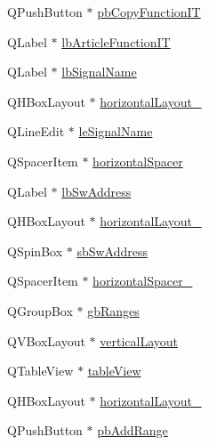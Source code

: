 \begin{DoxyCompactItemize}
\item 
Q\-Push\-Button $\ast$ \hyperlink{class_ui__mdt_cl_unit_connection_dialog_a7ccdc4772dbca1919fd77f73e4c1413b}{pb\-Copy\-Function\-I\-T}
\item 
Q\-Label $\ast$ \hyperlink{class_ui__mdt_cl_unit_connection_dialog_a7cb9be6da084f70be9ac5739bd8be3ca}{lb\-Article\-Function\-I\-T}
\item 
Q\-Label $\ast$ \hyperlink{class_ui__mdt_cl_unit_connection_dialog_a3bd4f5a49ae25bb621e2d2cba70c311f}{lb\-Signal\-Name}
\item 
Q\-H\-Box\-Layout $\ast$ \hyperlink{class_ui__mdt_cl_unit_connection_dialog_a78e9f20d85dd708397b44151debdbf25}{horizontal\-Layout\-\_}
\item 
Q\-Line\-Edit $\ast$ \hyperlink{class_ui__mdt_cl_unit_connection_dialog_aae843ac09a6334f90d2956aad37697ed}{le\-Signal\-Name}
\item 
Q\-Spacer\-Item $\ast$ \hyperlink{class_ui__mdt_cl_unit_connection_dialog_aea88a25a7d7660378eb7060bc297d7cd}{horizontal\-Spacer}
\item 
Q\-Label $\ast$ \hyperlink{class_ui__mdt_cl_unit_connection_dialog_ae214f352127ef47f8d492a431c25ff27}{lb\-Sw\-Address}
\item 
Q\-H\-Box\-Layout $\ast$ \hyperlink{class_ui__mdt_cl_unit_connection_dialog_a449b34bba644bb9bcf13ba4b58a22e5d}{horizontal\-Layout\-\_}
\item 
Q\-Spin\-Box $\ast$ \hyperlink{class_ui__mdt_cl_unit_connection_dialog_a33b682b708350ffd121c3fd8f3b00cc4}{sb\-Sw\-Address}
\item 
Q\-Spacer\-Item $\ast$ \hyperlink{class_ui__mdt_cl_unit_connection_dialog_a87549891f59b48945746bc9740c2a3ae}{horizontal\-Spacer\-\_}
\item 
Q\-Group\-Box $\ast$ \hyperlink{class_ui__mdt_cl_unit_connection_dialog_acd53dcfd25bd72639d65e9059955df7d}{gb\-Ranges}
\item 
Q\-V\-Box\-Layout $\ast$ \hyperlink{class_ui__mdt_cl_unit_connection_dialog_ab6f167890b806b8c9cd7eaaa7a172cae}{vertical\-Layout}
\item 
Q\-Table\-View $\ast$ \hyperlink{class_ui__mdt_cl_unit_connection_dialog_a5c7cd5489aef36dfc84df7976a778628}{table\-View}
\item 
Q\-H\-Box\-Layout $\ast$ \hyperlink{class_ui__mdt_cl_unit_connection_dialog_a548ef6d834725442ecefe1700dd419ec}{horizontal\-Layout\-\_}
\item 
Q\-Push\-Button $\ast$ \hyperlink{class_ui__mdt_cl_unit_connection_dialog_ac03093f3fbb6c456fe241c362a68ee18}{pb\-Add\-Range}

\end{DoxyCompactItemize}
